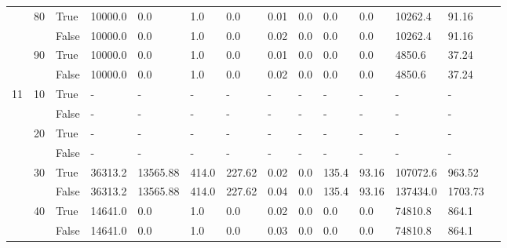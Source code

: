 \begin{landscape}
\begin{small}
\begin{longtable}[c]{@{}lll|ll|ll|ll|ll|lll@{}}
   & 80 & True  & 10000.0         & 0.0            & 1.0           & 0.0           & 0.01          & 0.0           & 0.0           & 0.0           & 10262.4       & 91.16       &  \\
   &    & False & 10000.0         & 0.0            & 1.0           & 0.0           & 0.02          & 0.0           & 0.0           & 0.0           & 10262.4       & 91.16       &  \\
   & 90 & True  & 10000.0         & 0.0            & 1.0           & 0.0           & 0.01          & 0.0           & 0.0           & 0.0           & 4850.6        & 37.24       &  \\
   &    & False & 10000.0         & 0.0            & 1.0           & 0.0           & 0.02          & 0.0           & 0.0           & 0.0           & 4850.6        & 37.24       &  \\
  \midrule
11 & 10 & True  & -               & -              & -             & -             & -             & -             & -             & -             & -             & -           &  \\
   &    & False & -               & -              & -             & -             & -             & -             & -             & -             & -             & -           &  \\
   & 20 & True  & -               & -              & -             & -             & -             & -             & -             & -             & -             & -           &  \\
   &    & False & -               & -              & -             & -             & -             & -             & -             & -             & -             & -           &  \\
   & 30 & True  & 36313.2         & 13565.88       & 414.0         & 227.62        & 0.02          & 0.0           & 135.4         & 93.16         & 107072.6      & 963.52      &  \\
   &    & False & 36313.2         & 13565.88       & 414.0         & 227.62        & 0.04          & 0.0           & 135.4         & 93.16         & 137434.0      & 1703.73     &  \\
   & 40 & True  & 14641.0         & 0.0            & 1.0           & 0.0           & 0.02          & 0.0           & 0.0           & 0.0           & 74810.8       & 864.1       &  \\
   &    & False & 14641.0         & 0.0            & 1.0           & 0.0           & 0.03          & 0.0           & 0.0           & 0.0           & 74810.8       & 864.1       &  \\

\end{longtable}
\end{small}
\end{landscape}
